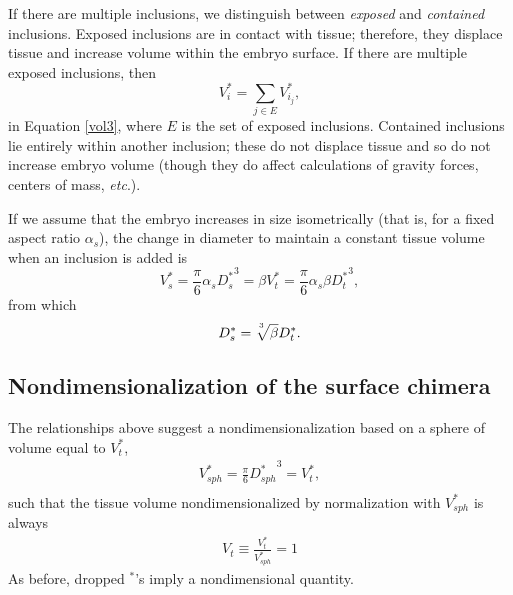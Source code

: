 \documentclass[10pt,a4paper]{article}
\def\non{\nonumber}
\def\etc{\emph{etc}.\xspace}
\begin{document}
If there are multiple inclusions, we distinguish between \textit{exposed} and \textit{contained} inclusions. 
Exposed inclusions are in contact with tissue; therefore, they displace tissue and increase volume within the embryo surface.  
If there are multiple exposed inclusions, then 
\begin{equation}\label{eqn:expincl}
	V_i^* = \sum_{j \in E} V^*_{i_j},
\end{equation}
in  Equation \ref{vol3}, where $E$ is the set of exposed inclusions.
Contained inclusions lie entirely within another inclusion; these do not displace tissue and so do not increase embryo volume (though they do affect calculations of gravity forces, centers of mass, \etc).


If we assume that the embryo increases in size isometrically (that is, for a fixed aspect ratio $\alpha_s$), the change in diameter to maintain a constant tissue volume when an inclusion is added is
\begin{equation}\label{vol4}
	V_s^*  = \frac{\pi}{6} \alpha_s {D_s^*}^3 = \beta V_t^* = \frac{\pi}{6} \alpha_s \beta {D_t^*}^3,
\end{equation} 
from which 
\begin{equation}\label{vol5}
	D_s^* = \sqrt[\uproot{5}3]{\beta} D_t^*.
\end{equation}




\subsection{Nondimensionalization of the surface chimera}
The relationships above suggest a nondimensionalization based on a sphere of volume equal to $V_t^*$,
\begin{eqnarray}\label{equivsphere}
	V_{sph}^* = \frac{\pi}{6} {D_{sph}^*}^3 = V_t^*, \non \\
\end{eqnarray} 
such that the tissue volume nondimensionalized by normalization with $V_{sph}^*$ is always
\begin{eqnarray}\label{equivsphere2}
	V_t \equiv \frac{V_t^*}{V_{sph}^*} = 1
\end{eqnarray} 
As before, dropped $^*$'s imply a nondimensional quantity.
\end{document}
